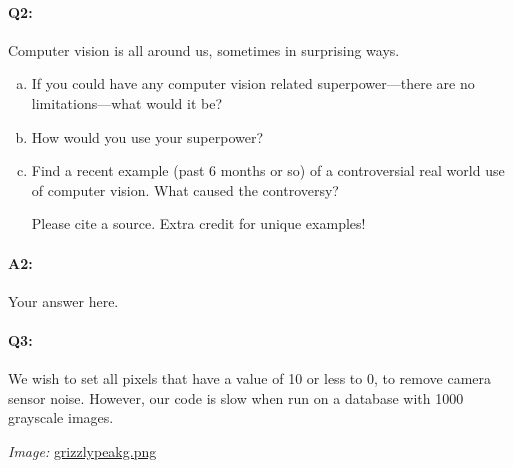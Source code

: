 \documentclass[11pt]{article}
\begin{document}



\pagebreak

\paragraph{Q2:}
Computer vision is all around us, sometimes in surprising ways. 
\begin{enumerate}[(a)]

\item
If you could have any computer vision related superpower---there are no limitations---what would it be?

\item
How would you use your superpower? 

\item Find a recent example (past 6 months or so) of a controversial real world use of computer vision. What caused the controversy?

Please cite a source. Extra credit for unique examples!
\end{enumerate}

\paragraph{A2:} Your answer here.








\pagebreak
\paragraph{Q3:} We wish to set all pixels that have a value of 10 or less to 0, to remove camera sensor noise. However, our code is slow when run on a database with 1000 grayscale images.

\emph{Image:} \href{grizzlypeakg.png}{grizzlypeakg.png}
\end{document}
